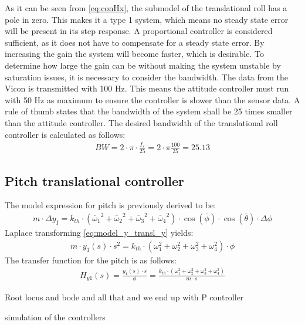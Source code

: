 As it can be seen from \autoref{eq:conHx}, the submodel of the translational roll has a pole in zero. This makes it a type 1 system, which means no steady state error will be present in its step response. 
A proportional controller is considered sufficient, as it does not have to compensate for a steady state error. By increasing the gain the system will become faster, which is desirable. To determine how large the gain can be without making the system unstable by saturation issues, it is necessary to consider the bandwidth. \newpar
The data from the Vicon is transmitted with 100 Hz. This means the attitude controller must run with 50 Hz as maximum to ensure the controller is slower than the sensor data. A rule of thumb states that the bandwidth of the system shall be 25 times smaller than the attitude controller. The desired bandwidth of the translational roll controller is calculated as follows:
\begin{align}
BW=2\cdot \pi\cdot \frac{f_s}{25}=2\cdot \pi \frac{100}{25}=25.13
\end{align}
\begin{where}
\end{where}

\subsection*{Pitch translational controller}
The model expression for pitch is previously derived to be:
\begin{align}
m\cdot\Delta\ddot{y}_I = k_{th}\cdot({\overline{\omega}_1}^2+{\overline{\omega}_2}^2+{\overline{\omega}_3}^2+{\overline{\omega}_4}^2)\cdot\cos(\overline{\phi})\cdot\cos(\overline{\theta})\cdot\Delta\phi
\label{eq:model_y_transl}
\end{align}
Laplace transforming \autoref{eq:model_y_transl_y} yields:
\begin{align}
m\cdot y_1(s)\cdot s^2= k_{th}\cdot (\omega_1 ^2 + \omega_2 ^2 + \omega_3 ^2 + \omega_4 ^2)\cdot \phi
\end{align}
The transfer function for the pitch is as follows:
\begin{align}
H_{y1}(s)=\frac{y_1(s)\cdot s}{\phi}=\frac{k_{th}\cdot (\omega_1 ^2 + \omega_2 ^2 + \omega_3 ^2 + \omega_4 ^2)}{m\cdot s}
\end{align}
\begin{where}
\end{where}
 
Root locus and bode and all that and we end up with P controller

simulation of the controllers
